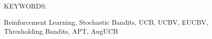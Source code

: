 \documentclass[MS,twoside]{iitmdiss}
\newcommand{\clearemptydoublepage}{\newpage{\cleardoublepage}}
\begin{document}
\clearemptydoublepage
\acknowledgements



\clearemptydoublepage
\abstract


\noindent KEYWORDS: \hspace*{0.5em} \parbox[t]{4.4in}{Reinforcement Learning, Stochastic Bandits, UCB, UCBV, EUCBV, Thresholding Bandits, APT, AugUCB}

\vspace*{24pt}
\noindent 



\end{document}
